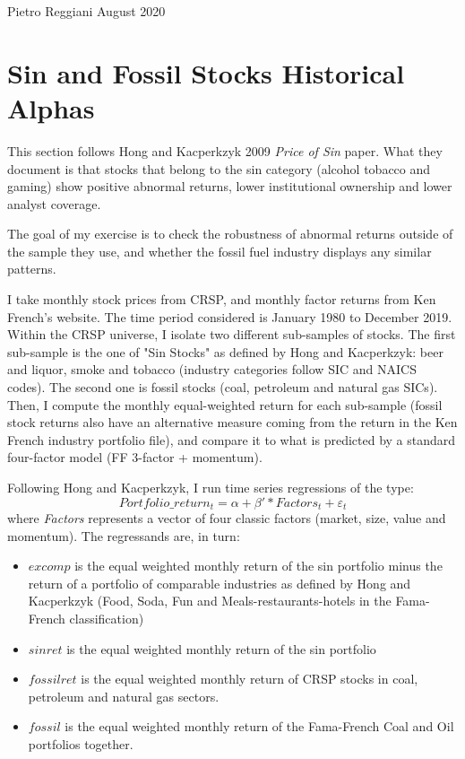 \documentclass[12pt]{article}
\numberwithin{equation}{section} %
\begin{document}
 
 
Pietro Reggiani August 2020



\section{Sin and Fossil Stocks Historical Alphas}
This section follows Hong and Kacperkzyk 2009 \textit{Price of Sin} paper. What they document is that stocks that belong to the sin category (alcohol tobacco and gaming) show positive abnormal returns, lower institutional ownership and lower analyst coverage.


 The goal of my exercise is to check the robustness of abnormal returns outside of the sample they use, and whether the fossil fuel industry displays any similar patterns. 
 
 I take monthly stock prices from CRSP, and monthly factor returns from Ken French's website. The time period considered is January 1980 to December 2019.
Within the CRSP universe, I isolate two different sub-samples of stocks. The first sub-sample is the one of "Sin Stocks" as defined by Hong and Kacperkzyk: beer and liquor, smoke and tobacco (industry categories follow SIC and NAICS codes). The second one is fossil stocks (coal, petroleum and natural gas SICs).
Then, I compute the monthly equal-weighted return for each sub-sample (fossil stock returns also have an alternative measure coming from the return in the Ken French industry portfolio file), and compare it to what is predicted by a standard four-factor model (FF 3-factor + momentum). 


Following Hong and Kacperkzyk, I run time series regressions of the type:
$$ Portfolio\_return_t = \alpha + \beta' * Factors_t + \varepsilon_t   $$
where \textit{Factors} represents a vector of four classic factors (market, size, value and momentum). The regressands are, in turn: 
\begin{itemize}
\item $excomp$ is the equal weighted monthly return of the sin portfolio minus the return of a portfolio of comparable industries as defined by Hong and Kacperkzyk (Food, Soda, Fun and Meals-restaurants-hotels in the Fama-French classification)
\item $sinret$ is the equal weighted monthly return of the sin portfolio
\item $fossilret$ is the equal weighted monthly return of CRSP stocks in coal, petroleum and natural gas sectors.
\item $fossil$ is the equal weighted monthly return of the Fama-French Coal and Oil portfolios together.
\end{itemize}
\end{document}
